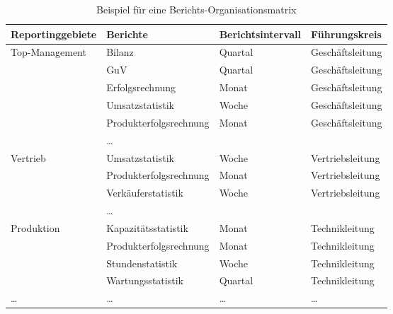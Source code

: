 \begin{table}[htbp]
  \centering
  \caption{Beispiel für eine Berichts-Organisationsmatrix}
  \label{tab:Beispiel_für_eine_Berichts-Organisationsmatrix}
  \small
  \begin{tabularx}{\textwidth}{@{}>{\raggedright\arraybackslash}p{2.5cm}>{\raggedright\arraybackslash}X>{\raggedright\arraybackslash}p{1.3cm}l@{}}
    \toprule
    Reporting\-gebiete & Berichte & Berichts\-intervall & Führungskreis \\
    \midrule
    Top-Management & Bilanz & Quartal & Geschäftsleitung \\
     & GuV & Quartal & Geschäftsleitung \\
     & Erfolgsrechnung & Monat & Geschäftsleitung \\
     & Umsatzstatistik & Woche & Geschäftsleitung \\
     & Produkterfolgsrechnung & Monat & Geschäftsleitung \\
     & \dots &  &  \\
    \addlinespace
    Vertrieb & Umsatzstatistik & Woche & Vertriebsleitung \\
     & Produkterfolgsrechnung & Monat & Vertriebsleitung \\
     & Verkäuferstatistik & Woche & Vertriebsleitung \\
     & \dots &  &  \\
    \addlinespace
    Produktion & Kapazitätsstatistik & Monat & Technikleitung \\
     & Produkterfolgsrechnung & Monat & Technikleitung \\
     & Stundenstatistik & Woche & Technikleitung \\
     & Wartungsstatistik & Quartal & Technikleitung \\
    \addlinespace
    \dots & \dots & \dots & \dots \\
    \bottomrule
  \end{tabularx}
\end{table}
